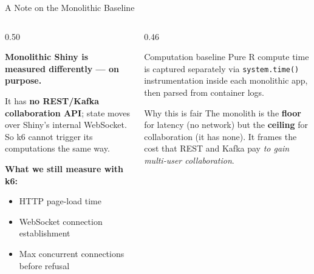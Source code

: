 \documentclass[aspectratio=169]{beamer}
\begin{document}
\begin{frame}{A Note on the Monolithic Baseline}

\begin{columns}[T]
\begin{column}{0.50\textwidth}

\textbf{Monolithic Shiny is measured differently --- on purpose.}

\vspace{0.5em}
It has \textbf{no REST/Kafka collaboration API}; state moves over
Shiny's internal WebSocket. So k6 cannot trigger its computations the
same way.

\vspace{0.5em}
\textbf{What we still measure with k6:}
\begin{itemize}
    \item HTTP page-load time
    \item WebSocket connection establishment
    \item Max concurrent connections before refusal
\end{itemize}

\end{column}
\begin{column}{0.46\textwidth}

\begin{block}{Computation baseline}
\small
Pure R compute time is captured separately via
\texttt{system.time()} instrumentation inside each monolithic app, then
parsed from container logs.
\end{block}

\vspace{0.5em}
\begin{exampleblock}{Why this is fair}
\small
The monolith is the \textbf{floor} for latency (no network) but the
\textbf{ceiling} for collaboration (it has none). It frames the cost
that REST and Kafka pay \textit{to gain multi-user collaboration}.
\end{exampleblock}

\end{column}
\end{columns}

\end{frame}
\end{document}
